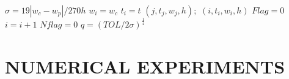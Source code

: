 \documentclass[12pt,oneside]{book}
\begin{document}
\begin{spacing}{1.2}
\begin{algorithm}[H]
\begin{algorithmic}[1]
							\STATE $ \sigma = 19 | w_{c} - w_{p} | / 270h $
								\STATE $ w_{i} = w_{c} $ \hspace*{0.5cm} 
								\STATE $ t_{i} = t $
										\RETURN $ (j, t_{j}, w_{j}, h); $ \hspace*{0.5cm} 
									\ENDFOR
								\ELSE
									\RETURN $ (i, t_{i}, w_{i}, h) $ \hspace*{0.5cm} 
								\ENDIF
									\STATE $ Flag = 0 $
								\ELSE %
									\STATE $ i = i + 1 $
									\STATE $ Nflag = 0 $
									\STATE $ q = (TOL / 2\sigma)^{\frac{1}{4}} $ %
									\ENDIF
								\ENDIF
							
							\ENDIF
						\ENDWHILE
					\end{algorithmic}
				\end{algorithm}
			
		\end{spacing}
		






	\chapter{NUMERICAL EXPERIMENTS}
	
	
	

	\backmatter
	
	\renewcommand{\bibname}{REFERENCES}
	
	
\end{document}
